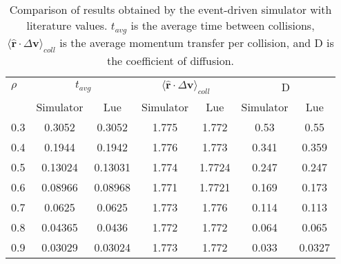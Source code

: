 \documentclass[12pt]{UoAthesis}
\begin{document}
\begin{table}
  \caption{Comparison of results obtained by the event-driven
    simulator with literature values. $t_{avg}$ is the average time
    between collisions, $\langle\mathbf{\hat{r}} \cdot \Delta
    \mathbf{v} \rangle_{coll}$ is the average momentum transfer per
    collision, and D is the coefficient of diffusion.} \label{tab:benchhard}
  \begin{center}
    \begin{tabular}{l c c c c c c}
      \toprule 
      $\rho$ & \multicolumn{2}{c}{$t_{avg}$} &
      \multicolumn{2}{c}{$\langle\mathbf{\hat{r}} \cdot \Delta
        \mathbf{v} \rangle_{coll}$} & \multicolumn{2}{c}{D} \\
      \cmidrule(rl{0.75em}){2-3}
      \cmidrule(rl{0.75em}){4-5}
      \cmidrule(rl{0.75em}){6-7}
      & Simulator & Lue & Simulator & Lue & Simulator & Lue\\
      \midrule
      0.3 & 0.3052 & 0.3052 & 1.775 & 1.772 & 0.53 & 0.55 \\
      0.4 & 0.1944 & 0.1942 & 1.776 & 1.773 & 0.341 & 0.359 \\
      0.5 & 0.13024 & 0.13031 & 1.774 & 1.7724 & 0.247 & 0.247 \\
      0.6 & 0.08966 & 0.08968 & 1.771 & 1.7721 & 0.169 & 0.173 \\
      0.7 & 0.0625 & 0.0625 & 1.773 & 1.776 & 0.114 & 0.113 \\
      0.8 & 0.04365 & 0.0436 & 1.772 & 1.772 & 0.064 & 0.065 \\
      0.9 & 0.03029 & 0.03024 & 1.773 & 1.772 & 0.033 & 0.0327 \\
      \bottomrule
    \end{tabular}
  \end{center}
\end{table}
\end{document}
